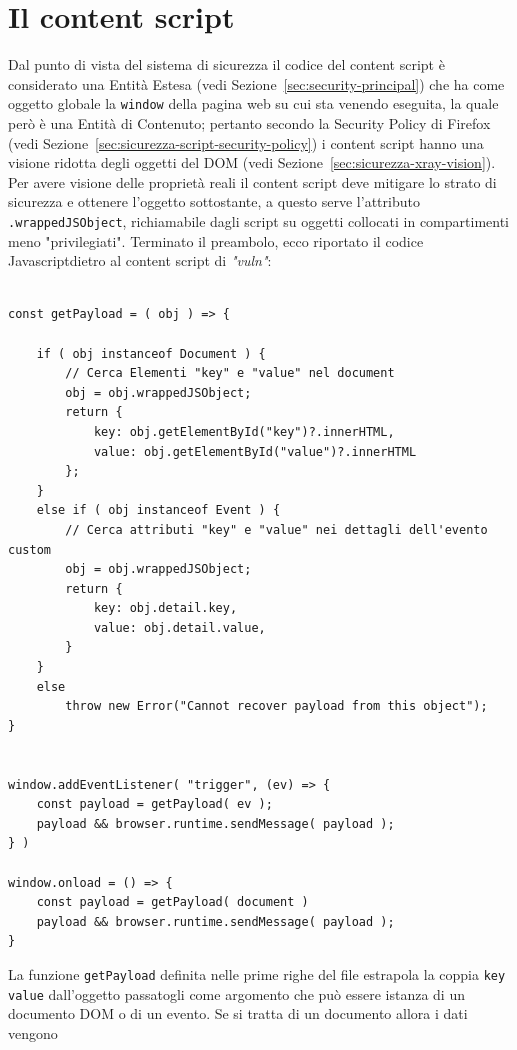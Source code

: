 \documentclass{sapthesis}
\newcommand{\code}[1]{\texttt{#1}}
\newcommand{\attr}[1]{\code{.#1}}
\newcommand{\refSection}[1]{Sezione~\ref{#1}}
\newcommand{\vuln}{\textit{"vuln"}}
\newcommand{\JS}{Javascript}
\begin{document}
    \section{Il content script}
    \label{sec:analisi-vuln-content-script}
        Dal punto di vista del sistema di sicurezza il codice del content script è considerato
        una Entità Estesa (vedi \refSection{sec:security-principal}) che ha come oggetto
        globale la \code{window} della pagina web su cui sta venendo eseguita, la quale
        però è una Entità di Contenuto; pertanto secondo la Security Policy di Firefox (vedi \refSection{sec:sicurezza-script-security-policy})
        i content script hanno una visione ridotta degli oggetti del DOM (vedi \refSection{sec:sicurezza-xray-vision}).
        Per avere visione delle proprietà reali il content script deve mitigare lo strato
        di sicurezza e ottenere l'oggetto sottostante, a questo serve l'attributo \attr{wrappedJSObject},
        richiamabile dagli script su oggetti collocati in compartimenti meno "privilegiati".
        Terminato il preambolo, ecco riportato il codice \JS dietro al content script di \vuln:
        \begin{lstlisting}

const getPayload = ( obj ) => {

    if ( obj instanceof Document ) {
        // Cerca Elementi "key" e "value" nel document
        obj = obj.wrappedJSObject;
        return { 
            key: obj.getElementById("key")?.innerHTML, 
            value: obj.getElementById("value")?.innerHTML 
        };
    }
    else if ( obj instanceof Event ) {
        // Cerca attributi "key" e "value" nei dettagli dell'evento custom
        obj = obj.wrappedJSObject;
        return {
            key: obj.detail.key,
            value: obj.detail.value,
        }
    }
    else
        throw new Error("Cannot recover payload from this object");
}


window.addEventListener( "trigger", (ev) => {
    const payload = getPayload( ev );
    payload && browser.runtime.sendMessage( payload );
} )

window.onload = () => {
    const payload = getPayload( document )
    payload && browser.runtime.sendMessage( payload );
}

        \end{lstlisting}
        La funzione \code{getPayload} definita nelle prime righe del file estrapola la coppia
        \code{key} \code{value} dall'oggetto passatogli come argomento che può essere istanza
        di un documento DOM o di un evento. Se si tratta di un documento allora i dati vengono
\end{document}
